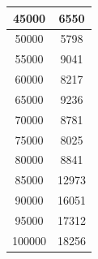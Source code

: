 \begin{table}[h!]
\begin{tabular}{cc}
\multicolumn{1}{|c|}{45000}                        & \multicolumn{1}{c|}{6550}                                                                                                                                     \\ \hline
\multicolumn{1}{|c|}{50000}                        & \multicolumn{1}{c|}{5798}                                                                                                                                     \\ \hline
\multicolumn{1}{|c|}{55000}                        & \multicolumn{1}{c|}{9041}                                                                                                                                     \\ \hline
\multicolumn{1}{|c|}{60000}                        & \multicolumn{1}{c|}{8217}                                                                                                                                     \\ \hline
\multicolumn{1}{|c|}{65000}                        & \multicolumn{1}{c|}{9236}                                                                                                                                     \\ \hline
\multicolumn{1}{|c|}{70000}                        & \multicolumn{1}{c|}{8781}                                                                                                                                     \\ \hline
\multicolumn{1}{|c|}{75000}                        & \multicolumn{1}{c|}{8025}                                                                                                                                     \\ \hline
\multicolumn{1}{|c|}{80000}                        & \multicolumn{1}{c|}{8841}                                                                                                                                     \\ \hline
\multicolumn{1}{|c|}{85000}                        & \multicolumn{1}{c|}{12973}                                                                                                                                     \\ \hline
\multicolumn{1}{|c|}{90000}                        & \multicolumn{1}{c|}{16051}                                                                                                                                     \\ \hline
\multicolumn{1}{|c|}{95000}                        & \multicolumn{1}{c|}{17312}                                                                                                                                     \\ \hline
\multicolumn{1}{|c|}{100000}                        & \multicolumn{1}{c|}{18256}                                                                                                                                     \\ \hline


\end{tabular}
\end{table}
